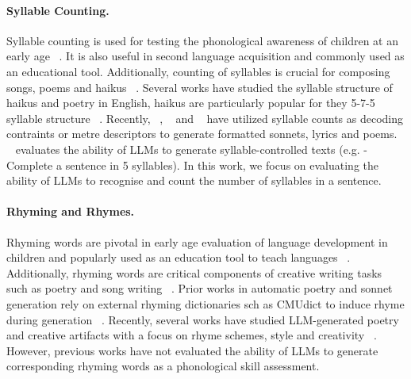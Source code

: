  \paragraph{Syllable Counting.} Syllable counting is used for testing the phonological awareness of children at an early age ~\citep{bruck1995phonological, ukrainetz2011effects}. It is also useful in second language acquisition and commonly used as an educational tool. Additionally, counting of syllables is crucial for composing songs, poems and haikus ~\citep{tian2022zeroshot, henderson1965haiku, suzuki1985role}. Several works have studied the syllable structure of haikus and poetry in English, haikus are particularly popular for they 5-7-5 syllable structure ~\citep{henderson1965haiku, suzuki1985role}. Recently, ~\citep{tian2022zeroshot}, ~\citep{tian2023unsupervised} and ~\citep{ormazabal2022poelm} have utilized syllable counts as decoding contraints or metre descriptors to generate formatted sonnets, lyrics and poems. ~\cite{sun2023evaluating} evaluates the ability of LLMs to generate syllable-controlled texts (e.g. - Complete a sentence in 5 syllables). In this work,  we focus on evaluating the ability of LLMs to recognise and count the number of syllables in a sentence. 

 \paragraph{Rhyming and Rhymes.} Rhyming words are pivotal in early age evaluation of language development in children and popularly used as an education tool to teach languages ~\citep{bruck1995phonological}. Additionally, rhyming words are critical components of creative writing tasks such as poetry and song writing ~\cite{caplan2014rhyme}. Prior works in automatic poetry and sonnet generation rely on external rhyming dictionaries sch as CMUdict to induce rhyme during generation ~\citep{tian2022zeroshot, tian2023unsupervised}. Recently, several works have studied LLM-generated poetry and creative artifacts with a focus on rhyme schemes, style and creativity ~\citep{sawicki2023bits}. However, previous works have not evaluated the ability of LLMs to generate corresponding rhyming words as a phonological skill assessment.  

